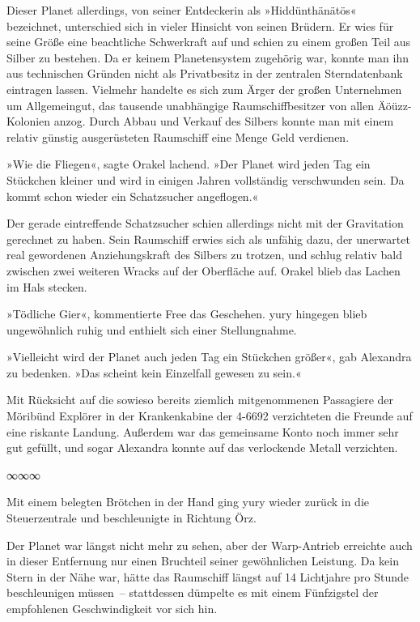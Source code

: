 Dieser Planet allerdings, von seiner Entdeckerin als »Hiddünthänätös« bezeichnet, unterschied sich in vieler Hinsicht von seinen Brüdern. Er wies für seine Größe eine beachtliche Schwerkraft auf und schien zu einem großen Teil aus Silber zu bestehen. Da er keinem Planetensystem zugehörig war, konnte man ihn aus technischen Gründen nicht als Privatbesitz in der zentralen Sterndatenbank eintragen lassen. Vielmehr handelte es sich zum Ärger der großen Unternehmen um Allgemeingut, das tausende unabhängige Raumschiffbesitzer von allen Äöüzz-Kolonien anzog. Durch Abbau und Verkauf des Silbers konnte man mit einem relativ günstig ausgerüsteten Raumschiff eine Menge Geld verdienen.

»Wie die Fliegen«, sagte Orakel lachend. »Der Planet wird jeden Tag ein Stückchen kleiner und wird in einigen Jahren vollständig verschwunden sein. Da kommt schon wieder ein Schatzsucher angeflogen.«

Der gerade eintreffende Schatzsucher schien allerdings nicht mit der Gravitation gerechnet zu haben. Sein Raumschiff erwies sich als unfähig dazu, der unerwartet real gewordenen Anziehungskraft des Silbers zu trotzen, und schlug relativ bald zwischen zwei weiteren Wracks auf der Oberfläche auf. Orakel blieb das Lachen im Hals stecken.

»Tödliche Gier«, kommentierte Free das Geschehen. yury hingegen blieb ungewöhnlich ruhig und enthielt sich einer Stellungnahme.

»Vielleicht wird der Planet auch jeden Tag ein Stückchen größer«, gab Alexandra zu bedenken. »Das scheint kein Einzelfall gewesen zu sein.«

Mit Rücksicht auf die sowieso bereits ziemlich mitgenommenen Passagiere der Möribünd Explörer in der Krankenkabine der 4-6692 verzichteten die Freunde auf eine riskante Landung. Außerdem war das gemeinsame Konto noch immer sehr gut gefüllt, und sogar Alexandra konnte auf das verlockende Metall verzichten.

\begin{center}
    ∞∞∞
\end{center}

Mit einem belegten Brötchen in der Hand ging yury wieder zurück in die Steuerzentrale und beschleunigte in Richtung Örz.

Der Planet war längst nicht mehr zu sehen, aber der Warp-Antrieb erreichte auch in dieser Entfernung nur einen Bruchteil seiner gewöhnlichen Leistung. Da kein Stern in der Nähe war, hätte das Raumschiff längst auf 14 Lichtjahre pro Stunde beschleunigen müssen~– stattdessen dümpelte es mit einem Fünfzigstel der empfohlenen Geschwindigkeit vor sich hin.

